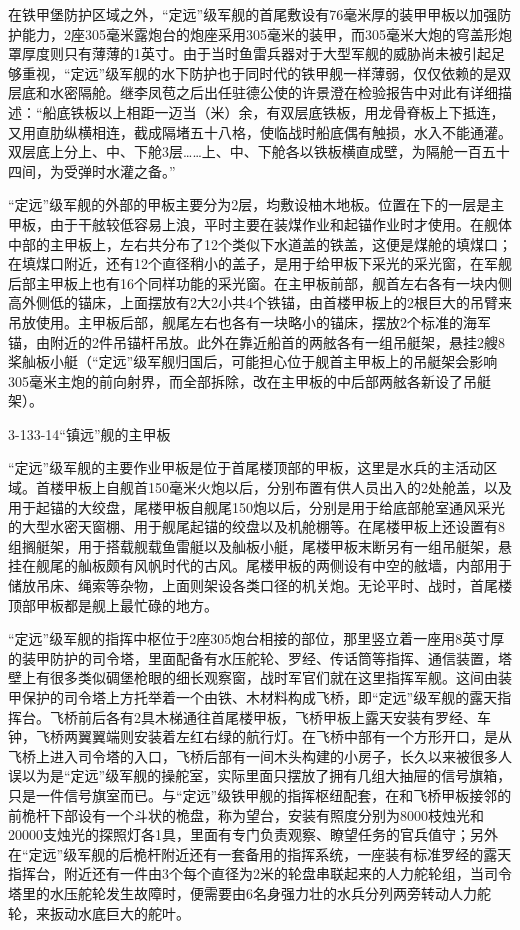 \documentclass[12pt,UTF8]{ctexbook}
\begin{document}
在铁甲堡防护区域之外，“定远”级军舰的首尾敷设有76毫米厚的装甲甲板以加强防护能力，2座305毫米露炮台的炮座采用305毫米的装甲，而305毫米大炮的穹盖形炮罩厚度则只有薄薄的1英寸。由于当时鱼雷兵器对于大型军舰的威胁尚未被引起足够重视，“定远”级军舰的水下防护也于同时代的铁甲舰一样薄弱，仅仅依赖的是双层底和水密隔舱。继李凤苞之后出任驻德公使的许景澄在检验报告中对此有详细描述：“船底铁板以上相距一迈当（米）余，有双层底铁板，用龙骨脊板上下抵连，又用直肋纵横相连，截成隔堵五十八格，使临战时船底偶有触损，水入不能通灌。双层底上分上、中、下舱3层……上、中、下舱各以铁板横直成壁，为隔舱一百五十四间，为受弹时水灌之备。”

“定远”级军舰的外部的甲板主要分为2层，均敷设柚木地板。位置在下的一层是主甲板，由于干舷较低容易上浪，平时主要在装煤作业和起锚作业时才使用。在舰体中部的主甲板上，左右共分布了12个类似下水道盖的铁盖，这便是煤舱的填煤口；在填煤口附近，还有12个直径稍小的盖子，是用于给甲板下采光的采光窗，在军舰后部主甲板上也有16个同样功能的采光窗。在主甲板前部，舰首左右各有一块内侧高外侧低的锚床，上面摆放有2大2小共4个铁锚，由首楼甲板上的2根巨大的吊臂来吊放使用。主甲板后部，舰尾左右也各有一块略小的锚床，摆放2个标准的海军锚，由附近的2件吊锚杆吊放。此外在靠近船首的两舷各有一组吊艇架，悬挂2艘8桨舢板小艇（“定远”级军舰归国后，可能担心位于舰首主甲板上的吊艇架会影响305毫米主炮的前向射界，而全部拆除，改在主甲板的中后部两舷各新设了吊艇架）。

3-133-14“镇远”舰的主甲板

“定远”级军舰的主要作业甲板是位于首尾楼顶部的甲板，这里是水兵的主活动区域。首楼甲板上自舰首150毫米火炮以后，分别布置有供人员出入的2处舱盖，以及用于起锚的大绞盘，尾楼甲板自舰尾150炮以后，分别是用于给底部舱室通风采光的大型水密天窗棚、用于舰尾起锚的绞盘以及机舱棚等。在尾楼甲板上还设置有8组搁艇架，用于搭载舰载鱼雷艇以及舢板小艇，尾楼甲板末断另有一组吊艇架，悬挂在舰尾的舢板颇有风帆时代的古风。尾楼甲板的两侧设有中空的舷墙，内部用于储放吊床、绳索等杂物，上面则架设各类口径的机关炮。无论平时、战时，首尾楼顶部甲板都是舰上最忙碌的地方。

“定远”级军舰的指挥中枢位于2座305炮台相接的部位，那里竖立着一座用8英寸厚的装甲防护的司令塔，里面配备有水压舵轮、罗经、传话筒等指挥、通信装置，塔壁上有很多类似碉堡枪眼的细长观察窗，战时军官们就在这里指挥军舰。这间由装甲保护的司令塔上方托举着一个由铁、木材料构成飞桥，即“定远”级军舰的露天指挥台。飞桥前后各有2具木梯通往首尾楼甲板，飞桥甲板上露天安装有罗经、车钟，飞桥两翼翼端则安装着左红右绿的航行灯。在飞桥中部有一个方形开口，是从飞桥上进入司令塔的入口，飞桥后部有一间木头构建的小房子，长久以来被很多人误以为是“定远”级军舰的操舵室，实际里面只摆放了拥有几组大抽屉的信号旗箱，只是一件信号旗室而已。与“定远”级铁甲舰的指挥枢纽配套，在和飞桥甲板接邻的前桅杆下部设有一个斗状的桅盘，称为望台，安装有照度分别为8000枝烛光和20000支烛光的探照灯各1具，里面有专门负责观察、瞭望任务的官兵值守；另外在“定远”级军舰的后桅杆附近还有一套备用的指挥系统，一座装有标准罗经的露天指挥台，附近还有一件由3个每个直径为2米的轮盘串联起来的人力舵轮组，当司令塔里的水压舵轮发生故障时，便需要由6名身强力壮的水兵分列两旁转动人力舵轮，来扳动水底巨大的舵叶。
\end{document}
